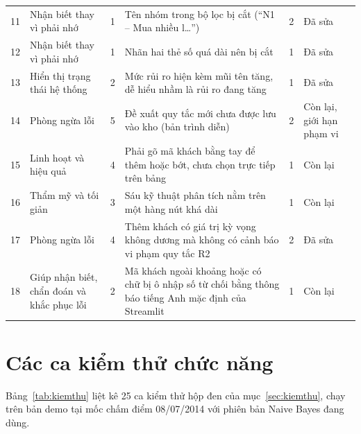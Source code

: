 {\begin{longtable}{p{0.6cm}p{3.3cm}p{1.4cm}p{6.2cm}p{0.8cm}p{1.5cm}}
11 & Nhận biết thay vì phải nhớ & 1 & Tên nhóm trong bộ lọc bị cắt (``N1 -- Mua nhiều l\ldots'') & 2 & Đã sửa \\
12 & Nhận biết thay vì phải nhớ & 1 & Nhãn hai thẻ số quá dài nên bị cắt & 1 & Đã sửa \\
13 & Hiển thị trạng thái hệ thống & 2 & Mức rủi ro hiện kèm mũi tên tăng, dễ hiểu nhầm là rủi ro đang tăng & 1 & Đã sửa \\
14 & Phòng ngừa lỗi & 5 & Đề xuất quy tắc mới chưa được lưu vào kho (bản trình diễn) & 2 & Còn lại, giới hạn phạm vi \\
15 & Linh hoạt và hiệu quả & 4 & Phải gõ mã khách bằng tay để thêm hoặc bớt, chưa chọn trực tiếp trên bảng & 1 & Còn lại \\
16 & Thẩm mỹ và tối giản & 3 & Sáu kỹ thuật phân tích nằm trên một hàng nút khá dài & 1 & Còn lại \\
17 & Phòng ngừa lỗi & 4 & Thêm khách có giá trị kỳ vọng không dương mà không có cảnh báo vi phạm quy tắc R2 & 2 & Đã sửa \\
18 & Giúp nhận biết, chẩn đoán và khắc phục lỗi & 2 & Mã khách ngoài khoảng hoặc có chữ bị ô nhập số từ chối bằng thông báo tiếng Anh mặc định của Streamlit & 1 & Còn lại \\
\end{longtable}
}

\section{Các ca kiểm thử chức năng}\label{sec:pl_kiemthu}
Bảng~\ref{tab:kiemthu} liệt kê 25 ca kiểm thử hộp đen của mục~\ref{sec:kiemthu}, chạy trên bản demo tại mốc chấm điểm 08/07/2014 với phiên bản Naive Bayes đang dùng.

